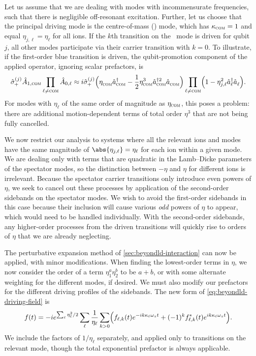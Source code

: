 Let us assume that we are dealing with modes with incommensurate frequencies, such that there is negligible off-resonant excitation.
Further, let us choose that the principal driving mode is the centre-of-mass (\com) mode, which has $\kappa_{\textsc{com}} = 1$ and equal $\eta_{j,\ell} = \eta_\ell$ for all ions.
If the $k$th transition on the \com\ mode is driven for qubit $j$, all other modes participate via their carrier transition with $k=0$.
To illustrate, if the first-order blue transition is driven, the qubit-promotion component of the applied operator, ignoring scalar prefactors, is
\begin{equation}
\hat{\sigma}_{\mkern-1mu+}^{(j)}\hat{A}_{1,{\textsc{com}}} \prod_{\ell\ne{\textsc{com}}}\hat{A}_{0,\ell} \approx
    i\hat{\sigma}_{\mkern-1mu+}^{(j)}\Bigl(\eta_{\textsc{com}}^{}\hat{a}^{\smash\dagger}_{\textsc{com}} - \frac12\eta^3_{\textsc{com}}\hat{a}^{\smash\dagger2}_{\textsc{com}}\hat{a}_{\textsc{com}}^{}\Bigr)
    \prod_{\ell\ne{\textsc{com}}}\Bigl(1 - \eta^2_{j,\ell}\hat{a}^{\smash\dagger}_\ell\hat{a}_\ell^{}\Bigr).
\end{equation}
For modes with $\eta_\ell$ of the same order of magnitude as $\eta_{\textsc{com}}$, this poses a problem: there are additional motion-dependent terms of total order $\eta^3$ that are not being fully cancelled.

We now restrict our analysis to systems where all the relevant ions and modes have the same magnitude of $\abs{\eta_{j,\ell}} = \eta_\ell$ for each ion within a given mode.
We are dealing only with terms that are quadratic in the Lamb--Dicke parameters of the spectator modes, so the distinction between $-\eta$ and $\eta$ for different ions is irrelevant.
Because the spectator carrier transitions only introduce even powers of $\eta$, we seek to cancel out these processes by application of the second-order sidebands on the spectator modes.
We wish to avoid the first-order sidebands in this case because their inclusion will cause various \emph{odd} powers of $\eta$ to appear, which would need to be handled individually.
With the second-order sidebands, any higher-order processes from the driven transitions will quickly rise to orders of $\eta$ that we are already neglecting.

The perturbative expansion method of \cref{sec:beyondld-interaction} can now be applied, with minor modifications.
When finding the lowest-order terms in $\eta$, we now consider the order of a term $\eta_1^a\eta_2^b$ to be $a+b$, or with some alternate weighting for the different modes, if desired.
We must also modify our prefactors for the different driving profiles of the sidebands.
The new form of \cref{eq:beyondld-driving-field} is
\begin{equation}\label{eq:beyondld-multimode-driving-field}
f(t) = -i e^{\sum_\ell \eta_\ell^2/2}\sum_\ell\frac1{\eta_\ell}\sum_{k>0}\Bigl(f_{\ell,k}(t)e^{-ik\kappa_\ell\omega_z t} + (-1)^kf_{\ell,k}^*(t)e^{ik\kappa_\ell\omega_z t}\Bigr).
\end{equation}
We include the factors of $1/\eta_\ell$ separately, and applied only to transitions on the relevant mode, though the total exponential prefactor is always applicable.

